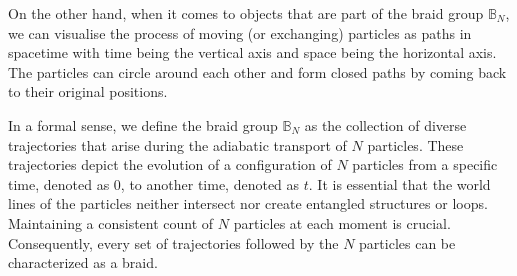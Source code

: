 On the other hand, when it comes to objects that are part of the braid group $\mathbb{B}_N$, we can visualise the process of moving (or exchanging) particles as paths in spacetime with time being the vertical axis and space being the horizontal axis. The particles can circle around each other and form closed paths by coming back to their original positions. \newline

In a formal sense, we define the braid group $\mathbb{B}_N$ as the collection of diverse trajectories that arise during the adiabatic transport of $N$ particles. These trajectories depict the evolution of a configuration of $N$ particles from a specific time, denoted as 0, to another time, denoted as $t$. It is essential that the world lines of the particles neither intersect nor create entangled structures or loops. Maintaining a consistent count of $N$ particles at each moment is crucial. Consequently, every set of trajectories followed by the $N$ particles can be characterized as a braid. \newline









